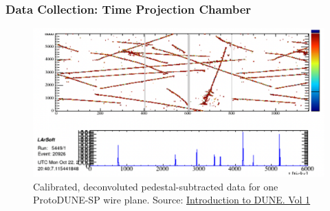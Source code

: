 \documentclass{beamer}
\begin{document}
\begin{frame}
	\frametitle{Data Collection: Time Projection Chamber}
	\begin{figure}[h!]
		\includegraphics[width=.8\textwidth]{images/data2.png}
		\caption{Calibrated, deconvoluted pedestal-subtracted data for one ProtoDUNE-SP wire plane. Source: \href{https://arxiv.org/abs/2002.02967}{\color{blue} Introduction to DUNE. Vol 1}}
		\label{far_detector}
	\end{figure}
\end{frame}




\end{document}
